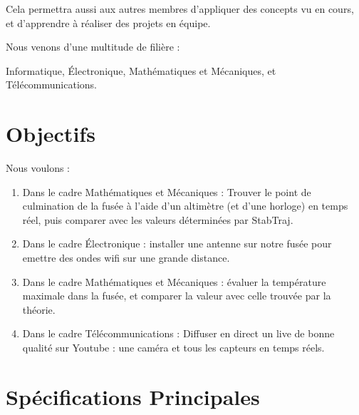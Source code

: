 \documentclass[48pt]{article}
\begin{document}
Cela permettra aussi aux autres membres d'appliquer des concepts vu en cours, et d'apprendre à réaliser des projets en équipe.

\vspace{2\baselineskip}

Nous venons d'une multitude de filière : 

Informatique, Électronique, Mathématiques et Mécaniques, et Télécommunications.

\vspace{2\baselineskip}

\section{\Large Objectifs}

\vspace{2\baselineskip}

Nous voulons : 

\begin{enumerate}
	\item Dans le cadre Mathématiques et Mécaniques : Trouver le point de culmination de la fusée à l'aide d'un altimètre (et d'une horloge) en temps réel, puis comparer avec les valeurs déterminées par StabTraj.

	\item Dans le cadre Électronique : installer une antenne sur notre fusée pour emettre des ondes wifi sur une grande distance.

	\item Dans le cadre Mathématiques et Mécaniques : évaluer la température maximale dans la fusée, et comparer la valeur avec celle trouvée par la théorie.

	\item Dans le cadre Télécommunications : Diffuser en direct un live de bonne qualité sur Youtube : \centering une caméra et tous les capteurs en temps réels.
\end{enumerate}
	
\newpage

\section{\centering \Large Spécifications Principales}

\vspace{2\baselineskip}
\end{document}
